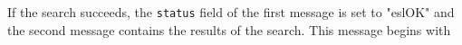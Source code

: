 \documentclass[notoc]{tufte-book}    %
\begin{document}
If the search succeeds, the {\tt status} field of the first message is set to "eslOK" and the second message contains the results of the search.  This message begins with   



\label{manualend}

% 
\end{document}
